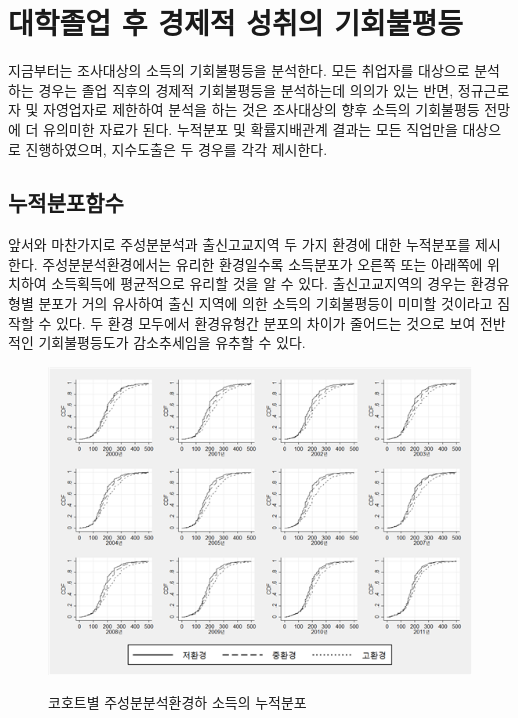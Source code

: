 \section{대학졸업 후 경제적 성취의 기회불평등}
지금부터는 조사대상의 소득의 기회불평등을 분석한다.
모든 취업자를 대상으로 분석하는 경우는 졸업 직후의 경제적 기회불평등을 분석하는데 의의가 있는 반면, 정규근로자 및 자영업자로 제한하여 분석을 하는 것은 조사대상의 향후 소득의 기회불평등 전망에 더 유의미한 자료가 된다.
누적분포 및 확률지배관계 결과는 모든 직업만을 대상으로 진행하였으며, 지수도출은 두 경우를 각각 제시한다.

\subsection{누적분포함수}
앞서와 마찬가지로 주성분분석과 출신고교지역 두 가지 환경에 대한 누적분포를 제시한다.
주성분분석환경에서는 유리한 환경일수록 소득분포가 오른쪽 또는 아래쪽에 위치하여 소득획득에 평균적으로 유리할 것을 알 수 있다.
출신고교지역의 경우는 환경유형별 분포가 거의 유사하여 출신 지역에 의한 소득의 기회불평등이 미미할 것이라고 짐작할 수 있다.
두 환경 모두에서 환경유형간 분포의 차이가 줄어드는 것으로 보여 전반적인 기회불평등도가 감소추세임을 유추할 수 있다.

\begin{figure}
    \centering
    \caption{코호트별 주성분분석환경하 소득의 누적분포}
    \includegraphics[width=\textwidth]{figure/gomse_cdf_bypca.png}
    \label{fig:gomse_cdf_bypca}
\end{figure}

